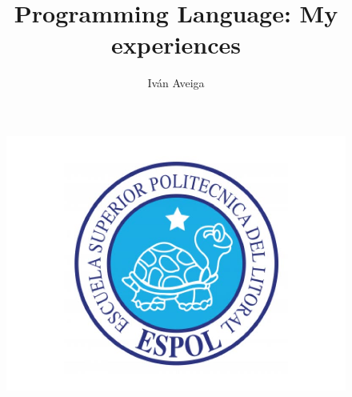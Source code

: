 \documentclass[a4paper,11pt]{article}
\begin{document}
	\author{Iván Aveiga}
	\title{Programming Language: My experiences}
	\maketitle
	\begin{figure}[h]
	\centering
	\includegraphics[width=0.7\linewidth]{./logo}
	\end{figure}
	\newpage
	
	\newpage
	
	\newpage
	
	\clearpage
	
	\clearpage 
\end{document}
